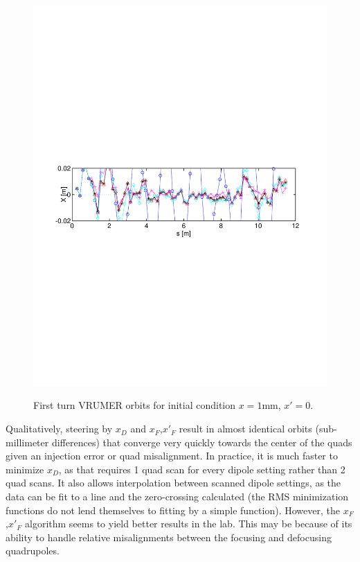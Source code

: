 \begin{figure}[!htb]
{	\includegraphics[width=\textwidth,trim={.5in 4.3in .7in 4.5in},clip]{3.figures/vrumer_steering_algorithm_compare_x1_xp0_sig5.pdf}}
\caption{First turn VRUMER orbits for initial condition $x=1$mm, $x'=0$. 
}
\label{fig:algorithm}
\end{figure}




Qualitatively, steering by $x_D$ and $x_F$,$x'_F$ result in almost identical orbits (sub-millimeter differences) that converge very quickly towards the center of the quads given an injection error or quad misalignment.
 In practice, it is much faster to minimize $x_D$, as that requires 1 quad scan for every dipole setting rather than 2 quad scans. It also allows interpolation between scanned dipole settings, as the data can be fit to a line and the zero-crossing calculated (the RMS minimization functions do not lend themselves to fitting by a simple function). However, the $x_F$,$x'_F$ algorithm seems to yield better results in the lab. 
This may be because of its ability to handle relative misalignments between the focusing and defocusing quadrupoles.

